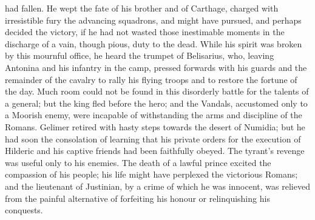 had fallen. He wept the fate of his brother and of Carthage, charged with irresistible fury the advancing squadrons, and might have pursued, and perhaps decided the victory, if he had not wasted those inestimable moments in the discharge of a vain, though pious, duty to the dead. While his spirit was broken by this mournful office, he heard the trumpet of Belisarius, who, leaving Antonina and his infantry in the camp, pressed forwards with his guards and the remainder of the cavalry to rally his flying troops and to restore the fortune of the day. Much room could not be found in this disorderly battle for the talents of a general; but the king fled before the hero; and the Vandals, accustomed only to a Moorish enemy, were incapable of withstanding the arms and discipline of the Romans. Gelimer retired with hasty steps towards the desert of Numidia; but he had soon the consolation of learning that his private orders for the execution of Hilderic and his captive friends had been faithfully obeyed. The tyrant\texthebrew{}’s revenge was useful only to his enemies. The death of a lawful prince excited the compassion of his people; his life might have perplexed the victorious Romans; and the lieutenant of Justinian, by a crime of which he was innocent, was relieved from the painful alternative of forfeiting his honour or relinquishing his conquests.

